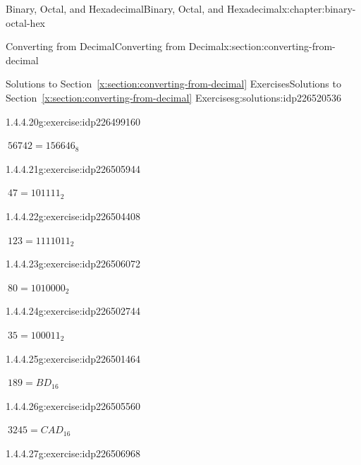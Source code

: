 \documentclass[twoside,10pt,]{book}
\newcommand{\xreffont}{\relax}
\numberwithin{equation}{section}
\begin{document}
\begin{chapterptx}{Binary, Octal, and Hexadecimal}{}{Binary, Octal, and Hexadecimal}{}{}{x:chapter:binary-octal-hex}
\begin{sectionptx}{Converting from Decimal}{}{Converting from Decimal}{}{}{x:section:converting-from-decimal}
\begin{solutions-subsection}{Solutions to Section~{\xreffont\ref*{x:section:converting-from-decimal}} Exercises}{}{Solutions to Section~{\xreffont\ref*{x:section:converting-from-decimal}} Exercises}{}{}{g:solutions:idp226520536}
\begin{exercisegroup}
\begin{divisionsolutioneg}{1.4.4.20}{}{g:exercise:idp226499160}%
\par\smallskip%
\noindent\hypertarget{g:solution:idp226504536-main}{}\(\ 56742=156646_8\)\end{divisionsolutioneg}%
\end{exercisegroup}
\par\medskip\noindent
\begin{exercisegroup}
\begin{divisionsolutioneg}{1.4.4.21}{}{g:exercise:idp226505944}%
\par\smallskip%
\noindent\hypertarget{g:solution:idp226499672-main}{}\(\ 47=101111_2\)\end{divisionsolutioneg}%
\begin{divisionsolutioneg}{1.4.4.22}{}{g:exercise:idp226504408}%
\par\smallskip%
\noindent\hypertarget{g:solution:idp226500184-main}{}\(\ 123=1111011_2\)\end{divisionsolutioneg}%
\begin{divisionsolutioneg}{1.4.4.23}{}{g:exercise:idp226506072}%
\par\smallskip%
\noindent\hypertarget{g:solution:idp226503512-main}{}\(\ 80=1010000_2\)\end{divisionsolutioneg}%
\begin{divisionsolutioneg}{1.4.4.24}{}{g:exercise:idp226502744}%
\par\smallskip%
\noindent\hypertarget{g:solution:idp226504664-main}{}\(\ 35=100011_2\)\end{divisionsolutioneg}%
\end{exercisegroup}
\par\medskip\noindent
\begin{exercisegroup}
\begin{divisionsolutioneg}{1.4.4.25}{}{g:exercise:idp226501464}%
\par\smallskip%
\noindent\hypertarget{g:solution:idp226502872-main}{}\(\ 189=BD_{16}\)\end{divisionsolutioneg}%
\begin{divisionsolutioneg}{1.4.4.26}{}{g:exercise:idp226505560}%
\par\smallskip%
\noindent\hypertarget{g:solution:idp226506328-main}{}\(\ 3245=CAD_{16}\)\end{divisionsolutioneg}%
\begin{divisionsolutioneg}{1.4.4.27}{}{g:exercise:idp226506968}%
\par\smallskip%

\end{divisionsolutioneg}
\end{exercisegroup}
\end{solutions-subsection}
\end{sectionptx}
\end{chapterptx}
\end{document}
